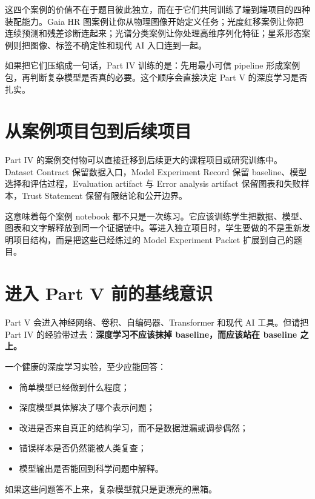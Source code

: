 这四个案例的价值不在于题目彼此独立，而在于它们共同训练了端到端项目的四种装配能力。Gaia HR 图案例让你从物理图像开始定义任务；光度红移案例让你把连续预测和残差诊断连起来；光谱分类案例让你处理高维序列化特征；星系形态案例则把图像、标签不确定性和现代 AI 入口连到一起。

如果把它们压缩成一句话，Part IV 训练的是：先用最小可信 pipeline 形成案例包，再判断复杂模型是否真的必要。这个顺序会直接决定 Part V 的深度学习是否扎实。

\section*{从案例项目包到后续项目}

Part IV 的案例交付物可以直接迁移到后续更大的课程项目或研究训练中。Dataset Contract 保留数据入口，Model Experiment Record 保留 baseline、模型选择和评估过程，Evaluation artifact 与 Error analysis artifact 保留图表和失败样本，Trust Statement 保留有限结论和公开边界。

这意味着每个案例 notebook 都不只是一次练习。它应该训练学生把数据、模型、图表和文字解释放到同一个证据链中。等进入独立项目时，学生要做的不是重新发明项目结构，而是把这些已经练过的 Model Experiment Packet 扩展到自己的题目。

\section*{进入 Part V 前的基线意识}

Part V 会进入神经网络、卷积、自编码器、Transformer 和现代 AI 工具。但请把 Part IV 的经验带过去：\textbf{深度学习不应该抹掉 baseline，而应该站在 baseline 之上。}

一个健康的深度学习实验，至少应能回答：

\begin{itemize}
    \item 简单模型已经做到什么程度；
    \item 深度模型具体解决了哪个表示问题；
    \item 改进是否来自真正的结构学习，而不是数据泄漏或调参偶然；
    \item 错误样本是否仍然能被人类复查；
    \item 模型输出是否能回到科学问题中解释。
\end{itemize}

如果这些问题答不上来，复杂模型就只是更漂亮的黑箱。
